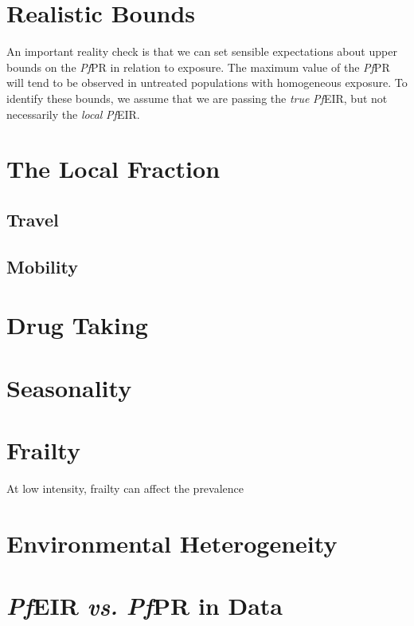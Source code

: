 \documentclass[
]{book}
\begin{document}
\section{Realistic Bounds}\label{realistic-bounds}

An important reality check is that we can set sensible expectations about upper bounds on the \emph{Pf}PR in relation to exposure. The maximum value of the \emph{Pf}PR will tend to be observed in untreated populations with homogeneous exposure. To identify these bounds, we assume that we are passing the \emph{true} \emph{Pf}EIR, but not necessarily the \emph{local} \emph{Pf}EIR.

\section{The Local Fraction}\label{the-local-fraction}

\subsection{Travel}\label{travel-1}

\subsection{Mobility}\label{mobility}

\section{Drug Taking}\label{drug-taking-1}

\section{Seasonality}\label{seasonality-1}

\section{Frailty}\label{frailty}

At low intensity, frailty can affect the prevalence

\section{Environmental Heterogeneity}\label{environmental-heterogeneity-1}

\section{\texorpdfstring{\emph{Pf}EIR \emph{vs.} \emph{Pf}PR in Data}{PfEIR vs. PfPR in Data}}\label{pfeir-vs.-pfpr-in-data}
\end{document}

